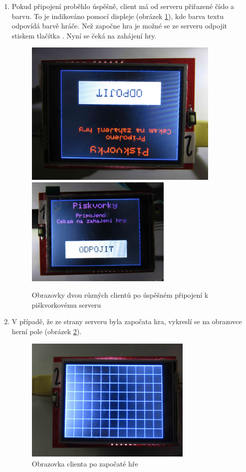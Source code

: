 \documentclass[a4paper,12pt, twoside]{article} %
\begin{document}
\begin{enumerate}
\item Pokud připojení proběhlo úspěšně, client má od serveru přiřazené číslo a barvu. To je indikováno pomocí displeje (obrázek \ref{fig:faze3}), kde barva textu odpovídá barvě hráče. Než započne hra je možné se ze serveru odpojit stiskem tlačítka . Nyní se čeká na zahájení hry.
\begin{figure}[H]
\centering
\includegraphics[height=7cm, angle=90]{img/foto/faze3a.jpg}
\includegraphics[width=7cm, angle=0]{img/foto/faze3b.jpg}
\caption{\label{fig:faze3} Obrazovky dvou různých clientů  po úspěšném připojení k piškvorkovému serveru}
\end{figure}
\label{item:faze3}

\item V případě, že ze strany serveru byla započata hra, vykreslí se na obrazovce herní pole (obrázek \ref{fig:faze4}). 
\begin{figure}[H]
\centering
\includegraphics[width=8cm, angle=0]{img/foto/faze4.jpg}
\caption{\label{fig:faze4} Obrazovka clienta po započaté hře}
\end{figure}


\end{enumerate}
\end{document}
